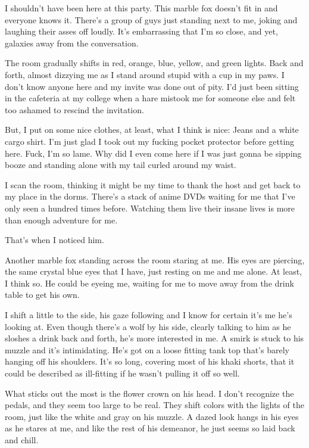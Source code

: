 I shouldn't have been here at this party. This marble fox doesn't fit in and everyone knows it. There's a group of guys just standing next to me, joking and laughing their asses off loudly. It's embarrassing that I'm so close, and yet, galaxies away from the conversation.

The room gradually shifts in red, orange, blue, yellow, and green lights. Back and forth, almost dizzying me as I stand around stupid with a cup in my paws. I don't know anyone here and my invite was done out of pity. I'd just been sitting in the cafeteria at my college when a hare mistook me for someone else and felt too ashamed to rescind the invitation.

But, I put on some nice clothes, at least, what I think is nice: Jeans and a white cargo shirt. I'm just glad I took out my fucking pocket protector before getting here. Fuck, I'm so lame. Why did I even come here if I was just gonna be sipping booze and standing alone with my tail curled around my waist.

I scan the room, thinking it might be my time to thank the host and get back to my place in the dorms. There's a stack of anime DVDs waiting for me that I've only seen a hundred times before. Watching them live their insane lives is more than enough adventure for me.

That's when I noticed him.

Another marble fox standing across the room staring at me. His eyes are piercing, the same crystal blue eyes that I have, just resting on me and me alone. At least, I think so. He could be eyeing me, waiting for me to move away from the drink table to get his own.

I shift a little to the side, his gaze following and I know for certain it's me he's looking at. Even though there's a wolf by his side, clearly talking to him as he sloshes a drink back and forth, he's more interested in me. A smirk is stuck to his muzzle and it's intimidating. He's got on a loose fitting tank top that's barely hanging off his shoulders. It's so long, covering most of his khaki shorts, that it could be described as ill-fitting if he wasn't pulling it off so well.

What sticks out the most is the flower crown on his head. I don't recognize the pedals, and they seem too large to be real. They shift colors with the lights of the room, just like the white and gray on his muzzle. A dazed look hangs in his eyes as he stares at me, and like the rest of his demeanor, he just seems so laid back and chill.

